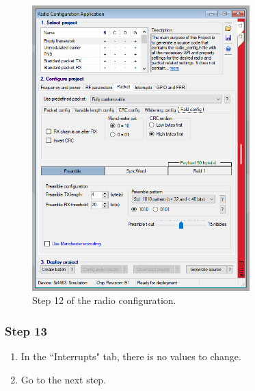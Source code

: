 \begin{figure}[!h]
	\begin{center}
		\includegraphics[width=0.75\textwidth]{figures/wds-tutorial/wds-tutorial-12.png}
		\caption{Step 12 of the radio configuration.}
		\label{fig:wds-tutorial-step-12}
	\end{center}
\end{figure}

\subsubsection{Step 13}

\begin{enumerate}
    \item In the ``Interrupts" tab, there is no values to change.
    \item Go to the next step.
\end{enumerate}

